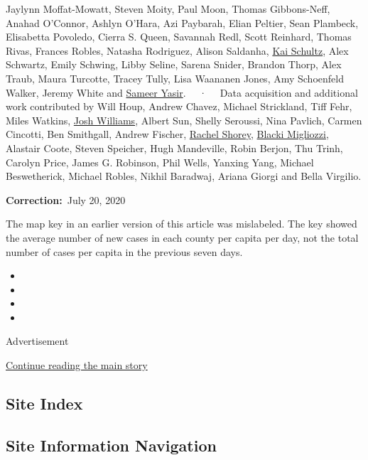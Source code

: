 Jaylynn Moffat-Mowatt, Steven Moity, Paul Moon, Thomas Gibbons-Neff,
Anahad O'Connor, Ashlyn O'Hara, Azi Paybarah, Elian Peltier, Sean
Plambeck, Elisabetta Povoledo, Cierra S. Queen, Savannah Redl, Scott
Reinhard, Thomas Rivas, Frances Robles, Natasha Rodriguez, Alison
Saldanha, \href{https://www.nytimes3xbfgragh.onion/by/kai-schultz}{Kai
Schultz}, Alex Schwartz, Emily Schwing, Libby Seline, Sarena Snider,
Brandon Thorp, Alex Traub, Maura Turcotte, Tracey Tully, Lisa Waananen
Jones, Amy Schoenfeld Walker, Jeremy White and
\href{https://www.nytimes3xbfgragh.onion/by/sameer-yasir}{Sameer Yasir}.
~~·~~ Data acquisition and additional work contributed by Will Houp,
Andrew Chavez, Michael Strickland, Tiff Fehr, Miles Watkins,
\href{https://www.nytimes3xbfgragh.onion/by/josh-williams}{Josh
Williams}, Albert Sun, Shelly Seroussi, Nina Pavlich, Carmen Cincotti,
Ben Smithgall, Andrew Fischer,
\href{https://www.nytimes3xbfgragh.onion/by/rachel-shorey}{Rachel
Shorey},
\href{https://www.nytimes3xbfgragh.onion/by/blacki-migliozzi}{Blacki
Migliozzi}, Alastair Coote, Steven Speicher, Hugh Mandeville, Robin
Berjon, Thu Trinh, Carolyn Price, James G. Robinson, Phil Wells, Yanxing
Yang, Michael Beswetherick, Michael Robles, Nikhil Baradwaj, Ariana
Giorgi and Bella Virgilio.

\textbf{Correction:}~July 20, 2020

The map key in an earlier version of this article was mislabeled. The
key showed the average number of new cases in each county per capita per
day, not the total number of cases per capita in the previous seven
days.

\begin{itemize}
\item
\item
\item
\item
\end{itemize}

Advertisement

\protect\hyperlink{after-bottom}{Continue reading the main story}

\hypertarget{site-index}{%
\subsection{Site Index}\label{site-index}}

\hypertarget{site-information-navigation}{%
\subsection{Site Information
Navigation}\label{site-information-navigation}}


